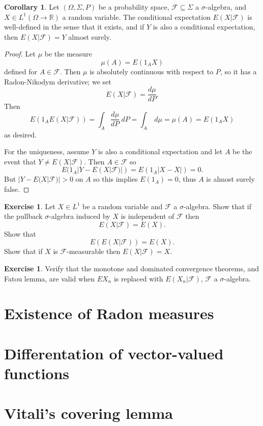 \documentclass[12pt]{book}
\newcommand{\RR}{\mathbb{R}}
\theoremstyle{definition}
\newtheorem{corollary}[theorem]{Corollary}
\newtheorem{exercise}[theorem]{Exercise}
\begin{document}
\begin{corollary}
Let $(\Omega, \Sigma, P)$ be a probability space, $\mathcal F \subseteq \Sigma$ a $\sigma$-algebra, and $X \in L^1(\Omega \to \RR)$ a random variable.
The conditional expectation $E(X|\mathcal F)$ is well-defined in the sense that it exists, and if $Y$ is also a conditional expectation, then $E(X|\mathcal F) = Y$ almost surely.
\end{corollary}
\begin{proof}
Let $\mu$ be the measure
$$\mu(A) = E(1_A X)$$
defined for $A \in \mathcal F$.
Then $\mu$ is absolutely continuous with respect to $P$, so it has a Radon-Nikodym derivative; we set
$$E(X|\mathcal F) = \frac{d\mu}{dP}.$$
Then
$$E(1_A E(X|\mathcal F)) = \int_A \frac{d\mu}{dP} ~dP = \int_A ~d\mu = \mu(A) = E(1_A X)$$
as desired.

For the uniqueness, assume $Y$ is also a conditional expectation and let $A$ be the event that $Y \neq E(X|\mathcal F)$.
Then $A \in \mathcal F$ so
$$E(1_A|Y - E(X|\mathcal F)|) = E(1_A|X - X|) = 0.$$
But $|Y - E(X|\mathcal F)| > 0$ on $A$ so this implies $E(1_A) = 0$, thus $A$ is almost surely false.
\end{proof}

\begin{exercise}
Let $X \in L^1$ be a random variable and $\mathcal F$ a $\sigma$-algebra. Show that if the pullback $\sigma$-algebra induced by $X$ is independent of $\mathcal F$ then
$$E(X|\mathcal F) = E(X).$$
Show that
$$E(E(X|\mathcal F)) = E(X).$$
Show that if $X$ is $\mathcal F$-measurable then $E(X|\mathcal F) = X$.
\end{exercise}

\begin{exercise}
Verify that the monotone and dominated convergence theorems, and Fatou lemma, are valid when $EX_n$ is replaced with $E(X_n|\mathcal F)$, $\mathcal F$ a $\sigma$-algebra.
\end{exercise}

\section{Existence of Radon measures}

\section{Differentation of vector-valued functions}

\section{Vitali's covering lemma}
\end{document}
